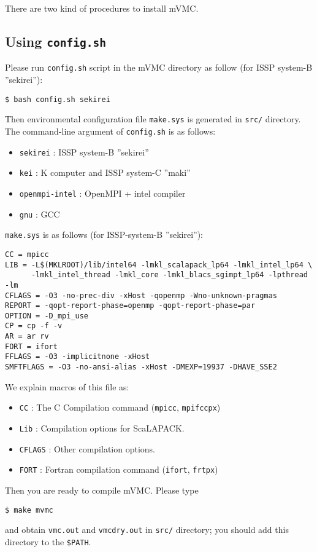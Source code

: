 There are two kind of procedures to install mVMC.

\subsection{Using \texttt{config.sh}}

Please run \verb|config.sh| script in the mVMC directory as follow
(for ISSP system-B ''sekirei''):
\begin{verbatim}
$ bash config.sh sekirei
\end{verbatim}
Then environmental configuration file \verb|make.sys| is generated in 
\verb|src/| directory.
The command-line argument of \verb|config.sh| is as follows:
\begin{itemize}
\item \verb|sekirei| : ISSP system-B ''sekirei''
\item \verb|kei| : K computer and ISSP system-C ''maki''
\item \verb|openmpi-intel| : OpenMPI + intel compiler
\item \verb|gnu| : GCC
\end{itemize}

\verb|make.sys| is as follows (for ISSP-system-B ''sekirei''):
\begin{verbatim}
CC = mpicc
LIB = -L$(MKLROOT)/lib/intel64 -lmkl_scalapack_lp64 -lmkl_intel_lp64 \
      -lmkl_intel_thread -lmkl_core -lmkl_blacs_sgimpt_lp64 -lpthread -lm
CFLAGS = -O3 -no-prec-div -xHost -qopenmp -Wno-unknown-pragmas
REPORT = -qopt-report-phase=openmp -qopt-report-phase=par
OPTION = -D_mpi_use
CP = cp -f -v
AR = ar rv
FORT = ifort
FFLAGS = -O3 -implicitnone -xHost
SMFTFLAGS = -O3 -no-ansi-alias -xHost -DMEXP=19937 -DHAVE_SSE2
\end{verbatim}
We explain macros of this file as: 
\begin{itemize}
\item \verb|CC| : The C Compilation command (\verb|mpicc|, \verb|mpifccpx|)
\item \verb|Lib| : Compilation options for ScaLAPACK.
\item \verb|CFLAGS| : Other compilation options.
\item \verb|FORT| : Fortran compilation command (\verb|ifort|, \verb|frtpx|)
\end{itemize}


Then you are ready to compile mVMC.
Please type
\begin{verbatim}
$ make mvmc
\end{verbatim}
and obtain \verb|vmc.out| and \verb|vmcdry.out| in \verb|src/| directory;
you should add this directory to the \verb|$PATH|.

